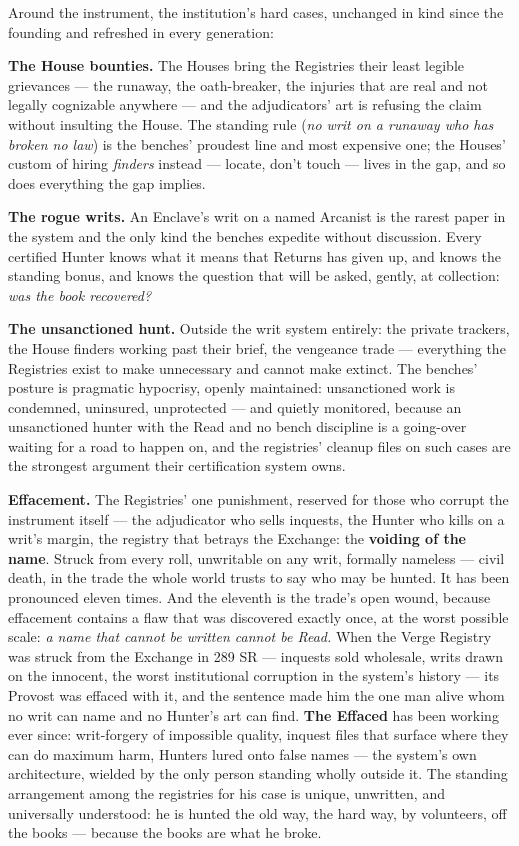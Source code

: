 Around the instrument, the institution's hard cases, unchanged in kind since the founding and refreshed in every generation:

\textbf{The House bounties.} The Houses bring the Registries their least legible grievances --- the runaway, the oath-breaker, the injuries that are real and not legally cognizable anywhere --- and the adjudicators' art is refusing the claim without insulting the House. The standing rule (\textit{no writ on a runaway who has broken no law}) is the benches' proudest line and most expensive one; the Houses' custom of hiring \textit{finders} instead --- locate, don't touch --- lives in the gap, and so does everything the gap implies.

\textbf{The rogue writs.} An Enclave's writ on a named Arcanist is the rarest paper in the system and the only kind the benches expedite without discussion. Every certified Hunter knows what it means that Returns has given up, and knows the standing bonus, and knows the question that will be asked, gently, at collection: \textit{was the book recovered?}

\textbf{The unsanctioned hunt.} Outside the writ system entirely: the private trackers, the House finders working past their brief, the vengeance trade --- everything the Registries exist to make unnecessary and cannot make extinct. The benches' posture is pragmatic hypocrisy, openly maintained: unsanctioned work is condemned, uninsured, unprotected --- and quietly monitored, because an unsanctioned hunter with the Read and no bench discipline is a going-over waiting for a road to happen on, and the registries' cleanup files on such cases are the strongest argument their certification system owns.

\textbf{Effacement.} The Registries' one punishment, reserved for those who corrupt the instrument itself --- the adjudicator who sells inquests, the Hunter who kills on a writ's margin, the registry that betrays the Exchange: the \textbf{voiding of the name}. Struck from every roll, unwritable on any writ, formally nameless --- civil death, in the trade the whole world trusts to say who may be hunted. It has been pronounced eleven times. And the eleventh is the trade's open wound, because effacement contains a flaw that was discovered exactly once, at the worst possible scale: \textit{a name that cannot be written cannot be Read.} When the Verge Registry was struck from the Exchange in 289 SR --- inquests sold wholesale, writs drawn on the innocent, the worst institutional corruption in the system's history --- its Provost was effaced with it, and the sentence made him the one man alive whom no writ can name and no Hunter's art can find. \textbf{The Effaced} has been working ever since: writ-forgery of impossible quality, inquest files that surface where they can do maximum harm, Hunters lured onto false names --- the system's own architecture, wielded by the only person standing wholly outside it. The standing arrangement among the registries for his case is unique, unwritten, and universally understood: he is hunted the old way, the hard way, by volunteers, off the books --- because the books are what he broke.

